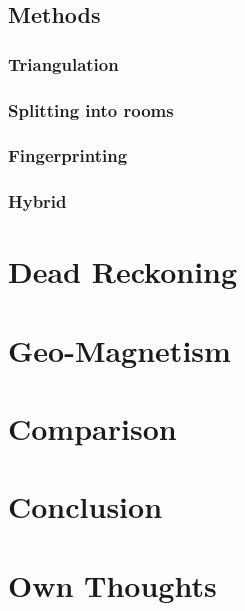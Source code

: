 \documentclass[12pt,a4paper]{article}
\begin{document}
\subsection{Methods}
\subsubsection{Triangulation}

\subsubsection{Splitting into rooms}

\subsubsection{Fingerprinting}
\subsubsection{Hybrid}

\section{Dead Reckoning}


\section{Geo-Magnetism}


\section{Comparison}

\section{Conclusion}

\section{Own Thoughts}




\end{document}
